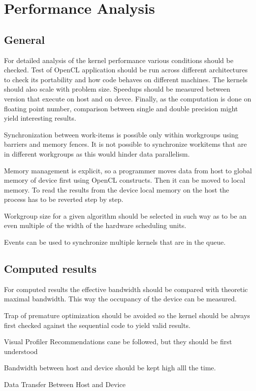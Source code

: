 \chapter{Performance Analysis}
\section{General}
For detailed analysis of the kernel performance various conditions should be checked. Test of OpenCL application should be run across different architectures to check its portability and how code behaves on different machines. The kernels should also scale with problem size. Speedups should be measured between version that execute on host and on devce. Finally, as the computation is done on floating point number, comparison between single and double precision might yield interesting results.

Synchronization between work-items is possible only within workgroups using barriers and memory fences. It is not possible to synchronize workitems that are in different workgroups as this would hinder data parallelism.

Memory management is explicit, so a programmer moves data from host to global memory of device first using OpenCL constructs. Then it can be moved to local memory. To read the results from the device local memory on the host the process has to be reverted step by step.

Workgroup size for a given algorithm should be selected in such way as to be an even multiple of the width of the hardware scheduling units.

Events can be used to synchronize multiple kernels that are in the queue.

\section{Computed results}
For computed results the effective bandwidth should be compared with theoretic maximal bandwidth. This way the occupancy of the device can be measured.

Trap of premature optimization should be avoided so the kernel should be always first checked against the sequential code to yield valid results.

Visual Profiler Recommendations cane be followed, but they should be first understood

Bandwidth between host and device should be kept high alll the time.

Data Transfer Between Host and Device

